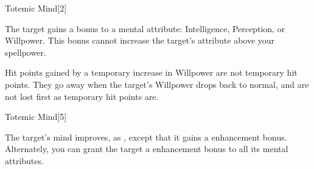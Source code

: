 \begin{spellsection}{Totemic Mind}[2]
    \begin{spellheader}
    \end{spellheader}
    \begin{spellcontent}
        \begin{spelltargetinginfo}
        \end{spelltargetinginfo}
        \begin{spelleffects}
            \spelleffect The target gains a  bonus to a mental attribute: Intelligence, Perception, or Willpower. This bonus cannot increase the target's attribute above your spellpower.
            \spelldur \durpersonallong
        \end{spelleffects}
    \end{spellcontent}
    \begin{spellfooter}
        \spellnotes Hit points gained by a temporary increase in Willpower are not temporary hit points. They go away when the target's Willpower drops back to normal, and are not lost first as temporary hit points are.
    \end{spellfooter}
\end{spellsection}

\begin{spellsection}[Greater]{Totemic Mind}[5]
    \begin{spellheader}
    \end{spellheader}
    \begin{spellcontent}
        \begin{spelltargetinginfo}
        \end{spelltargetinginfo}
        \begin{spelleffects}
            \spelleffect The target's mind improves, as , except that it gains a  enhancement bonus. Alternately, you can grant the target a  enhancement bonus to all its mental attributes.
            \spelldur \durpersonallong
        \end{spelleffects}
    \end{spellcontent}
    \begin{spellfooter}
    \end{spellfooter}
\end{spellsection}

